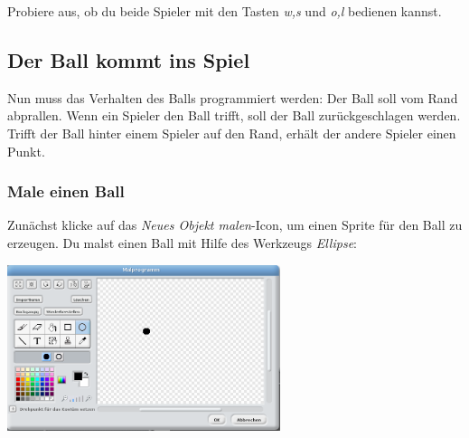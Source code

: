 Probiere aus, ob du beide Spieler mit den Tasten \emph{w,s} und \emph{o,l} bedienen kannst.

\subsection{Der Ball kommt ins Spiel}
Nun muss das Verhalten des Balls programmiert werden: Der Ball soll vom Rand abprallen. Wenn ein Spieler den Ball trifft, soll der Ball zurückgeschlagen werden. Trifft der Ball hinter einem Spieler auf den Rand, erhält der andere Spieler einen Punkt.

\subsubsection{Male einen Ball}
Zunächst klicke auf das \textit{Neues Objekt malen}-Icon, um einen Sprite für den Ball zu erzeugen. 
Du malst einen Ball mit Hilfe des Werkzeugs \emph{Ellipse}:

\includegraphics[width=0.6\textwidth]{images/aufgabe5_pong_sprite_ball_malen.png}


